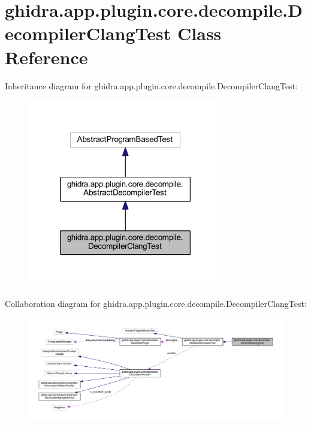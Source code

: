 \hypertarget{classghidra_1_1app_1_1plugin_1_1core_1_1decompile_1_1_decompiler_clang_test}{}\section{ghidra.\+app.\+plugin.\+core.\+decompile.\+Decompiler\+Clang\+Test Class Reference}
\label{classghidra_1_1app_1_1plugin_1_1core_1_1decompile_1_1_decompiler_clang_test}


Inheritance diagram for ghidra.\+app.\+plugin.\+core.\+decompile.\+Decompiler\+Clang\+Test\+:
\nopagebreak
\begin{figure}[H]
\begin{center}
\leavevmode
\includegraphics[width=242pt]{classghidra_1_1app_1_1plugin_1_1core_1_1decompile_1_1_decompiler_clang_test__inherit__graph}
\end{center}
\end{figure}


Collaboration diagram for ghidra.\+app.\+plugin.\+core.\+decompile.\+Decompiler\+Clang\+Test\+:
\nopagebreak
\begin{figure}[H]
\begin{center}
\leavevmode
\includegraphics[width=350pt]{classghidra_1_1app_1_1plugin_1_1core_1_1decompile_1_1_decompiler_clang_test__coll__graph}
\end{center}
\end{figure}
